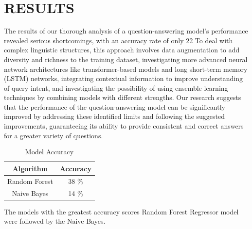 \documentclass[conference]{IEEEtran}
\begin{document}
\section{RESULTS}
The results of our thorough analysis of a question-answering model's performance revealed serious shortcomings, with an accuracy rate of only 22%
To deal with complex linguistic structures, this approach involves data augmentation to add diversity and richness to the training dataset, investigating more advanced neural network architectures like transformer-based models and long short-term memory (LSTM) networks, integrating contextual information to improve understanding of query intent, and investigating the possibility of using ensemble learning techniques by combining models with different strengths. Our research suggests that the performance of the question-answering model can be significantly improved by addressing these identified limits and following the suggested improvements, guaranteeing its ability to provide consistent and correct answers for a greater variety of questions.

\begin{table}[htbp]
\caption{Model Accuracy}
\begin{center}
   
    \begin{tabular}{|c|c|}
        \hline
        Algorithm & Accuracy \\
        \hline
        Random Forest & 38 \% \\
        \hline
        Naive Bayes & 14 \% \\
        \hline
    \end{tabular}
    
    \end{center}
\end{table}

The models with the greatest accuracy scores Random Forest Regressor model were followed by the Naive Bayes.  
\end{document}
